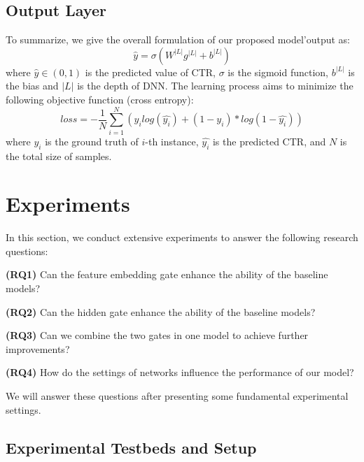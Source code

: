 \documentclass[sigconf,nonacm=true]{acmart}
\begin{document}
\subsection{Output Layer}
To summarize, we give the overall formulation of our proposed model'output as:
\begin{equation}
    \hat{y}=\sigma(W^{|L|}g^{|L|} + b^{|L|})
\end{equation}
where $\hat{y} \in(0,1)$ is the predicted value of CTR, $\sigma$ is the sigmoid function, $b^{|L|}$ is the bias and $|L|$ is the depth of DNN. The learning process aims to minimize the following objective function
(cross entropy):
\begin{equation}
   loss = {-}\frac{1}{N}\sum_{i=1}^{N}({y_i}log(\hat{y_i})+(1-y_i)*log(1-\hat{y_i}))
\end{equation}
where $y_i$ is the ground truth of $i$-th instance, $\hat{y_i}$ is
the predicted CTR, and $N$ is the total size of samples.

\section{Experiments}
\label{sec:s4}
In this section, we conduct extensive experiments to answer the following research questions:

\noindent\textbf{(RQ1)} Can the feature embedding gate enhance the ability of the baseline models?

\noindent\textbf{(RQ2)} Can the hidden gate enhance the ability of the baseline models?

\noindent\textbf{(RQ3)} Can we combine the two gates in one model to achieve further improvements?

\noindent\textbf{(RQ4)} How do the settings of networks influence the performance of our model?

We will answer these questions after presenting some fundamental experimental settings.
\subsection{Experimental Testbeds and Setup}
\end{document}
